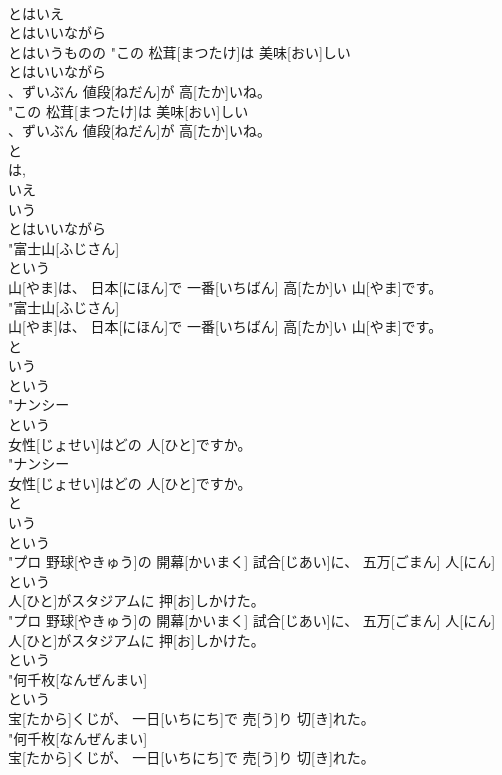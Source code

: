 \documentclass[8pt]{extreport}
\begin{document}
\begin{CJK}{UTF8}{min}
\\	とはいえ
\\	とはいいながら 
\\	とはいうものの	"この 松茸[まつたけ]は 美味[おい]しい
\\	とはいいながら
\\	、ずいぶん 値段[ねだん]が 高[たか]いね。
\\	"この 松茸[まつたけ]は 美味[おい]しい
\\	、ずいぶん 値段[ねだん]が 高[たか]いね。
\\	と 
\\	は, 
\\	いえ 
\\	いう 
\\	とはいいながら
\\	"富士山[ふじさん]
\\	という
\\	山[やま]は、 日本[にほん]で 一番[いちばん] 高[たか]い 山[やま]です。
\\	"富士山[ふじさん]
\\	山[やま]は、 日本[にほん]で 一番[いちばん] 高[たか]い 山[やま]です。
\\	と 
\\	いう	
\\	という
\\	"ナンシー
\\	という
\\	女性[じょせい]はどの 人[ひと]ですか。
\\	"ナンシー
\\	女性[じょせい]はどの 人[ひと]ですか。
\\	と 
\\	いう	
\\	という
\\	"プロ 野球[やきゅう]の 開幕[かいまく] 試合[じあい]に、 五万[ごまん] 人[にん]
\\	という
\\	人[ひと]がスタジアムに 押[お]しかけた。
\\	"プロ 野球[やきゅう]の 開幕[かいまく] 試合[じあい]に、 五万[ごまん] 人[にん]
\\	人[ひと]がスタジアムに 押[お]しかけた。
\\	という
\\	"何千枚[なんぜんまい]
\\	という
\\	宝[たから]くじが、 一日[いちにち]で 売[う]り 切[き]れた。
\\	"何千枚[なんぜんまい]
\\	宝[たから]くじが、 一日[いちにち]で 売[う]り 切[き]れた。

\end{CJK}
\end{document}
